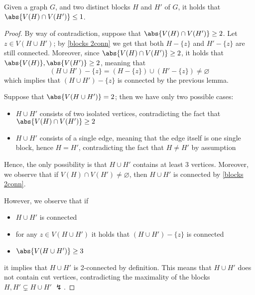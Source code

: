 \documentclass[a4paper, 12pt]{report}
\begin{document}
    \begin{framedprop}{}
        Given a graph $G$, and two distinct blocks $H$ and $H'$ of $G$, it holds that $\abs{V(H) \cap V(H')} \le 1$.
    \end{framedprop}
    
    \begin{proof}
        By way of contradiction, suppose that $\abs{V(H) \cap V(H')} \ge 2$. Let $z \in V(H \cup H')$; by \cref{blocks 2conn} we get that both $H - \{z\}$ and $H' - \{z\}$ are still connected. Moreover, since $\abs{V(H) \cap V(H')} \ge 2$, it holds that $\abs{V(H)}, \abs{V(H')} \ge 2$, meaning that $$(H \cup H') - \{z\} = (H - \{z\}) \cup (H' - \{z\}) \neq \varnothing$$ which implies that $(H \cup H') - \{z\}$ is connected by the previous lemma.

        Suppose that $\abs{V(H \cup H')} = 2$; then we have only two possible cases:

        \begin{itemize}
            \item $H \cup H'$ consists of two isolated vertices, contradicting the fact that $\abs{V(H) \cap V(H')} \ge 2$
            \item $H \cup H'$ consists of a single edge, meaning that the edge itself is one single block, hence $H = H'$, contradicting the fact that $H \neq H'$ by assumption
        \end{itemize}

        Hence, the only possibility is that $H \cup H'$ contains at least 3 vertices. Moreover, we observe that if $V(H) \cap V(H') \neq \varnothing$, then $H \cup H'$ is connected by \cref{blocks 2conn}.

        However, we observe that if

        \begin{itemize}
            \item $H \cup H'$ is connected
            \item for any $z \in V(H \cup H')$ it holds that $(H \cup H') - \{z\}$ is connected
            \item $\abs{V(H \cup H')} \ge 3$
        \end{itemize}

        it implies that $H \cup H'$ is 2-connected by definition. This means that $H \cup H'$ does not contain cut vertices, contradicting the maximality of the blocks $H, H' \subsetneq H \cup H'$ $\lightning$.
    \end{proof}
\end{document}
